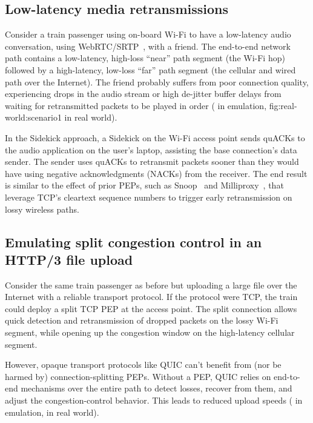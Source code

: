 \subsection{Low-latency media retransmissions}

Consider a train passenger using on-board Wi-Fi to have a low-latency audio
conversation, using WebRTC/SRTP~\cite{rfc8834webrtc}, with a friend. The
end-to-end network path contains a low-latency, high-loss ``near'' path
segment (the Wi-Fi hop) followed by a high-latency, low-loss ``far'' path
segment (the cellular and wired path over the Internet). The friend probably
suffers from poor connection quality, experiencing drops in the audio stream or
high de-jitter buffer delays from waiting for retransmitted packets to be
played in order ( in emulation, \Cref
{fig:real-world:scenario1} in real world).

In the Sidekick approach, a Sidekick on the Wi-Fi access point sends quACKs to the audio
application on the user's laptop, assisting the base connection's data sender.
The sender uses quACKs to retransmit packets sooner than they would have using
negative acknowledgments (NACKs) from the receiver. The end result is similar
to the effect of prior PEPs, such as Snoop~\cite{balakrishnan1995snoop} and
Milliproxy~\cite{polese2017milliproxy}, that leverage TCP's cleartext sequence
numbers to trigger early retransmission on lossy wireless paths.

\subsection{Emulating split congestion control in an HTTP/3 file upload}

Consider the same train passenger as before but uploading a large file over the
Internet with a reliable transport protocol. If the protocol were TCP, the
train could deploy a split TCP PEP at the access point. The split connection
allows quick detection and retransmission of dropped packets on the lossy Wi-Fi
segment, while opening up the congestion window on the high-latency cellular
segment.

However, opaque transport protocols like QUIC can't benefit from (nor be harmed
by) connection-splitting PEPs. Without a PEP, QUIC relies on end-to-end
mechanisms over the entire path to detect losses, recover from them, and adjust
the congestion-control behavior. This leads to reduced upload speeds
( in emulation,  in real world).

